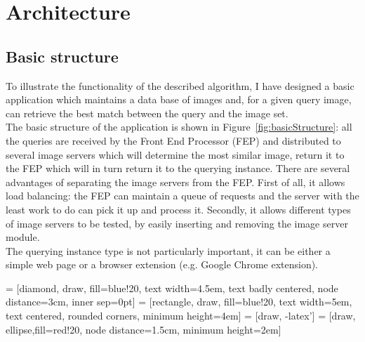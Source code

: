 \chapter{Architecture}
\label{chap:implementation}

\section{Basic structure}

To illustrate the functionality of the described algorithm, I have designed a basic application which maintains a data base of images and, for a given query image, can retrieve the best match between
the query and the image set.\\
The basic structure of the application is shown in Figure~\ref{fig:basicStructure}: all the queries are received by the Front End Processor (FEP) and distributed to several image servers which will determine the most similar image, return it to the FEP which will in turn return it to the querying instance. There are several advantages of separating the image servers from the FEP. First of all, it allows load balancing: the FEP can maintain a queue of requests and the server with the least work to do can pick it up and process it. Secondly, it allows different types of image servers to be tested, by easily inserting and removing the image server module.\\
The querying instance type is not particularly important, it can be either a simple web page or a browser extension (e.g. Google Chrome extension).

 = [diamond, draw, fill=blue!20, 
    text width=4.5em, text badly centered, node distance=3cm, inner sep=0pt]
 = [rectangle, draw, fill=blue!20, 
    text width=5em, text centered, rounded corners, minimum height=4em]
 = [draw, -latex']
 = [draw, ellipse,fill=red!20, node distance=1.5cm,
    minimum height=2em]

